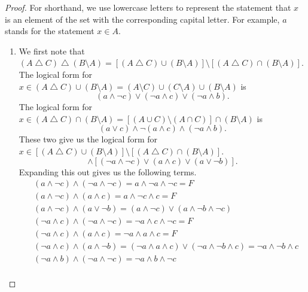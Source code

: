 \documentclass[12pt]{amsart}
\theoremstyle{definition}
\theoremstyle{remark}
\begin{document}
\begin{proof}
For shorthand, we use lowercase letters to represent the statement that $x$ is an element of the set with the corresponding capital letter.
For example, $a$ stands for the statement $x \in A$.
\begin{enumerate}
	\item We first note that $(A \bigtriangleup C) \bigtriangleup (B \setminus A) = [(A \bigtriangleup C) \cup (B \setminus A)] \setminus [(A \bigtriangleup C) \cap (B \setminus A)]$.
	The logical form for $x \in (A \bigtriangleup C) \cup (B \setminus A) = (A \setminus C) \cup (C \setminus A) \cup (B \setminus A)$ is
	\begin{equation*}
		(a \wedge \neg c) \vee (\neg a \wedge c) \vee (\neg a \wedge b).
	\end{equation*}
	The logical form for $x \in (A \bigtriangleup C) \cap (B \setminus A) = [(A \cup C) \setminus (A \cap C)] \cap (B \setminus A)$ is
	\begin{equation*}
		(a \vee c) \wedge \neg (a \wedge c) \wedge (\neg a \wedge b).
	\end{equation*}
	These two give us the logical form for $x \in [(A \bigtriangleup C) \cup (B \setminus A)] \setminus [(A \bigtriangleup C) \cap (B \setminus A)]$.
	\begin{equation*}
		[(a \wedge \neg c) \vee (\neg a \wedge c) \vee (\neg a \wedge b)]
		\wedge [(\neg a \wedge \neg c) \vee (a \wedge c) \vee (a \vee \neg b)].
	\end{equation*}
	Expanding this out gives us the following terms.
	\begin{align*}
		& (a \wedge \neg c) \wedge (\neg a \wedge \neg c) = a \wedge \neg a \wedge \neg c = F \\
		& (a \wedge \neg c) \wedge (a \wedge c) = a \wedge \neg c \wedge c = F \\
		& (a \wedge \neg c) \wedge (a \vee \neg b) 
			= (a \wedge \neg c) \vee (a \wedge \neg b \wedge \neg c) \\
		& (\neg a \wedge c) \wedge (\neg a \wedge \neg c) = \neg a \wedge c \wedge \neg c = F \\
		& (\neg a \wedge c) \wedge (a \wedge c) = \neg a \wedge a \wedge c = F \\
		& (\neg a \wedge c) \wedge (a \wedge \neg b) 
			= (\neg a \wedge a \wedge c) \vee (\neg a \wedge \neg b \wedge c) 
			= \neg a \wedge \neg b \wedge c \\
		& (\neg a \wedge b) \wedge (\neg a \wedge \neg c) = \neg a \wedge b \wedge \neg c \\

\end{align*}
\end{enumerate}
\end{proof}
\end{document}
